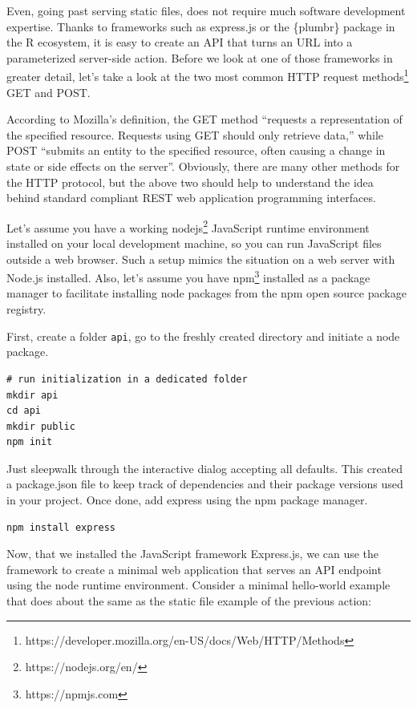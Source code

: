 \documentclass[
  12pt,
  letterpaper,
]{krantz}
\begin{document}
Even, going past serving static files, does not require much software
development expertise. Thanks to frameworks such as express.js or the
\{plumbr\} package in the R ecosystem, it is easy to create an API that
turns an URL into a parameterized server-side action. Before we look at
one of those frameworks in greater detail, let's take a look at the two
most common HTTP request methods\footnote{https://developer.mozilla.org/en-US/docs/Web/HTTP/Methods}
GET and POST.

According to Mozilla's definition, the GET method ``requests a
representation of the specified resource. Requests using GET should only
retrieve data,'' while POST ``submits an entity to the specified
resource, often causing a change in state or side effects on the
server''. Obviously, there are many other methods for the HTTP protocol,
but the above two should help to understand the idea behind standard
compliant REST web application programming interfaces.

Let's assume you have a working nodejs\footnote{https://nodejs.org/en/}
JavaScript runtime environment installed on your local
development machine, so you can run JavaScript files outside a web
browser. Such a setup mimics the situation on a web server with Node.js
installed. Also, let's assume you have npm\footnote{https://npmjs.com}
installed as a package manager to facilitate installing node packages
from the npm open source package registry.

First, create a folder \texttt{api}, go to the freshly created directory
and initiate a node package.

\begin{verbatim}
# run initialization in a dedicated folder
mkdir api
cd api
mkdir public 
npm init
\end{verbatim}

Just sleepwalk through the interactive dialog accepting all defaults.
This created a package.json file to keep track of dependencies and their
package versions used in your project. Once done, add express using the
npm package manager.

\begin{verbatim}
npm install express
\end{verbatim}

Now, that we installed the JavaScript framework Express.js, we can use
the framework to create a minimal web application that serves an API
endpoint using the node runtime environment. Consider a minimal
hello-world example that does about the same as the static file example
of the previous action:
\end{document}

